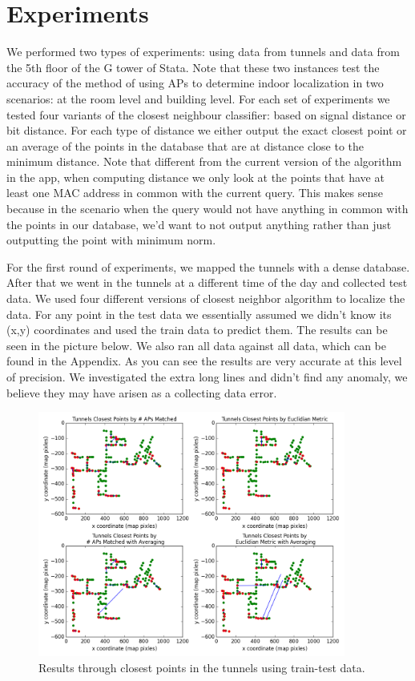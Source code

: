 \documentclass[11pt]{article}
\begin{document}
\section{Experiments}
We performed two types of experiments: using data from tunnels and data from the 5th floor of the G tower of Stata. Note that these two instances test the accuracy of the method of using APs to determine indoor localization in two scenarios: at the room level and building level. For each set of experiments we tested four variants of the closest neighbour classifier: based on signal distance or bit distance. For each type of distance we either output the exact closest point or an average of the points in the database that are at distance close to the minimum distance. Note that different from the current version of the algorithm in the app, when computing distance we only look at the points that have at least one MAC address in common with the current query. This makes sense because in the scenario when the query would not have anything in common with the points in our database, we’d want to not output anything rather than just outputting the point with minimum norm.

For the first round of experiments, we mapped the tunnels with a dense database. After that we went in the tunnels at a different time of the day and collected test data. We used four different versions of closest neighbor algorithm to localize the data. For any point in the test data we essentially assumed we didn’t know its (x,y) coordinates and used the train data to predict them. The results can be seen in the picture below. We also ran all data against all data, which can be found in the Appendix. As you can see the results are very accurate at this level of precision. We investigated the extra long lines and didn’t find any anomaly, we believe they may have arisen as a collecting data error.

\begin{figure}[h]
\centering
\includegraphics[width=0.9\textwidth]{tunnels_traintunnels_test_all_graphs.png}
\caption{Results through closest points in the tunnels using train-test data.}
\label{fig:tunnels_test}
\end{figure}
\end{document}
